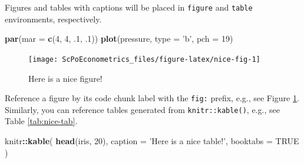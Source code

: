 \documentclass[]{book}
\newenvironment{Shaded}{\begin{snugshade}}{\end{snugshade}}
\newcommand{\KeywordTok}[1]{\textcolor[rgb]{0.13,0.29,0.53}{\textbf{#1}}}
\newcommand{\DataTypeTok}[1]{\textcolor[rgb]{0.13,0.29,0.53}{#1}}
\newcommand{\DecValTok}[1]{\textcolor[rgb]{0.00,0.00,0.81}{#1}}
\newcommand{\StringTok}[1]{\textcolor[rgb]{0.31,0.60,0.02}{#1}}
\newcommand{\OtherTok}[1]{\textcolor[rgb]{0.56,0.35,0.01}{#1}}
\newcommand{\OperatorTok}[1]{\textcolor[rgb]{0.81,0.36,0.00}{\textbf{#1}}}
\newcommand{\NormalTok}[1]{#1}
\theoremstyle{definition}
\theoremstyle{definition}
\theoremstyle{definition}
\theoremstyle{remark}
\begin{document}
Figures and tables with captions will be placed in \texttt{figure} and
\texttt{table} environments, respectively.

\begin{Shaded}
\begin{Highlighting}[]
\KeywordTok{par}\NormalTok{(}\DataTypeTok{mar =} \KeywordTok{c}\NormalTok{(}\DecValTok{4}\NormalTok{, }\DecValTok{4}\NormalTok{, .}\DecValTok{1}\NormalTok{, .}\DecValTok{1}\NormalTok{))}
\KeywordTok{plot}\NormalTok{(pressure, }\DataTypeTok{type =} \StringTok{'b'}\NormalTok{, }\DataTypeTok{pch =} \DecValTok{19}\NormalTok{)}
\end{Highlighting}
\end{Shaded}

\begin{figure}

{\centering \texttt{[image: ScPoEconometrics\_files/figure-latex/nice-fig-1]} 

}

\caption{Here is a nice figure!}\label{fig:nice-fig}
\end{figure}

Reference a figure by its code chunk label with the \texttt{fig:}
prefix, e.g., see Figure \ref{fig:nice-fig}. Similarly, you can
reference tables generated from \texttt{knitr::kable()}, e.g., see Table
\ref{tab:nice-tab}.

\begin{Shaded}
\begin{Highlighting}[]
\NormalTok{knitr}\OperatorTok{::}\KeywordTok{kable}\NormalTok{(}
  \KeywordTok{head}\NormalTok{(iris, }\DecValTok{20}\NormalTok{), }\DataTypeTok{caption =} \StringTok{'Here is a nice table!'}\NormalTok{,}
  \DataTypeTok{booktabs =} \OtherTok{TRUE}
\NormalTok{)}
\end{Highlighting}
\end{Shaded}
\end{document}
